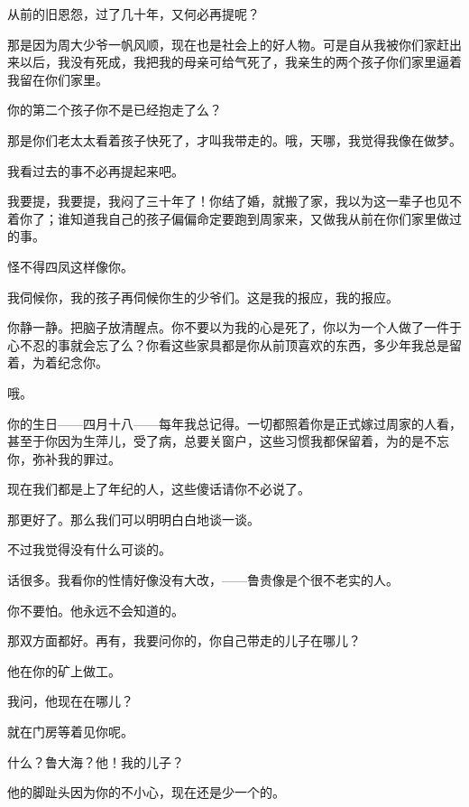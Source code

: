 从前的旧恩怨，过了几十年，又何必再提呢？

那是因为周大少爷一帆风顺，现在也是社会上的好人物。可是自从我被你们家赶出来以后，我没有死成，我把我的母亲可给气死了，我亲生的两个孩子你们家里逼着我留在你们家里。

你的第二个孩子你不是已经抱走了么？

那是你们老太太看着孩子快死了，才叫我带走的。哦，天哪，我觉得我像在做梦。

我看过去的事不必再提起来吧。

我要提，我要提，我闷了三十年了！你结了婚，就搬了家，我以为这一辈子也见不着你了；谁知道我自己的孩子偏偏命定要跑到周家来，又做我从前在你们家里做过的事。

怪不得四凤这样像你。

我伺候你，我的孩子再伺候你生的少爷们。这是我的报应，我的报应。

你静一静。把脑子放清醒点。你不要以为我的心是死了，你以为一个人做了一件于心不忍的事就会忘了么？你看这些家具都是你从前顶喜欢的东西，多少年我总是留着，为着纪念你。

哦。

你的生日——四月十八——每年我总记得。一切都照着你是正式嫁过周家的人看，甚至于你因为生萍儿，受了病，总要关窗户，这些习惯我都保留着，为的是不忘你，弥补我的罪过。

现在我们都是上了年纪的人，这些傻话请你不必说了。

那更好了。那么我们可以明明白白地谈一谈。

不过我觉得没有什么可谈的。

话很多。我看你的性情好像没有大改，——鲁贵像是个很不老实的人。

你不要怕。他永远不会知道的。

那双方面都好。再有，我要问你的，你自己带走的儿子在哪儿？

他在你的矿上做工。

我问，他现在在哪儿？

就在门房等着见你呢。

什么？鲁大海？他！我的儿子？

他的脚趾头因为你的不小心，现在还是少一个的。

